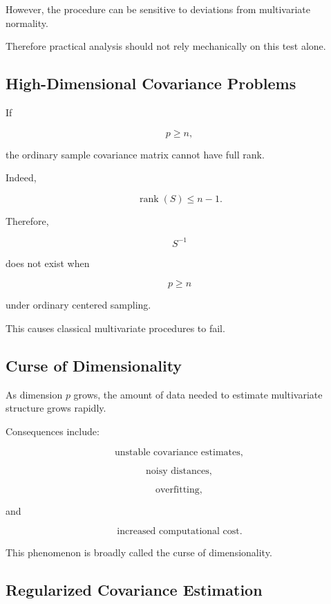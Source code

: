 However, the procedure can be sensitive to deviations from multivariate
normality.

Therefore practical analysis should not rely mechanically on this test
alone.

\subsection{High-Dimensional Covariance Problems}
\label{subsec:high-dimensional-covariance}

If

\[
p\geq n,
\]

the ordinary sample covariance matrix cannot have full rank.

Indeed,

\[
\boxed{
\operatorname{rank}(S)
\leq
n-1.
}
\]

Therefore,

\[
\boxed{
S^{-1}
}
\]

does not exist when

\[
p\geq n
\]

under ordinary centered sampling.

This causes classical multivariate procedures to fail.

\subsection{Curse of Dimensionality}
\label{subsec:curse-dimensionality-multivariate}

As dimension \(p\) grows, the amount of data needed to estimate
multivariate structure grows rapidly.

Consequences include:

\[
\boxed{
\text{unstable covariance estimates},
}
\]

\[
\boxed{
\text{noisy distances},
}
\]

\[
\boxed{
\text{overfitting},
}
\]

and

\[
\boxed{
\text{increased computational cost}.
}
\]

This phenomenon is broadly called the curse of dimensionality.

\subsection{Regularized Covariance Estimation}
\label{subsec:regularized-covariance-estimation}

